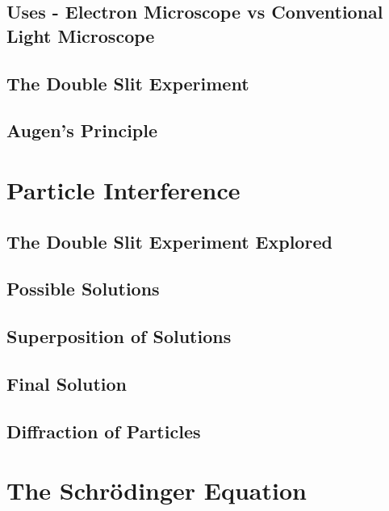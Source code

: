 \documentclass[colorlinks,11pt,a4paper,normalphoto,withhyper,ragged2e]{altareport}
\begin{document}
	
	\subsection{Uses - Electron Microscope vs Conventional Light Microscope}
	
	
	\subsection{The Double Slit Experiment}
	
	
	\subsection{Augen’s Principle}
	
	
	\pagebreak
	
	
	
	
\section{Particle Interference}
	
	\subsection{The Double Slit Experiment Explored}
	
	
	\subsection{Possible Solutions}
	
	
	\subsection{Superposition of Solutions}
	
	
	\subsection{Final Solution}
	
	
	\subsection{Diffraction of Particles}
	
	
	\pagebreak
	
	
	
	
\section{The Schrödinger Equation}
	
\end{document}
